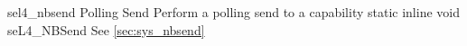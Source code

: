 %
%
%
%

\apidoc
{sel4_nbsend}
{Polling Send}
{Perform a polling send to a capability}
{static inline void seL4\_NBSend}
{
}
{\noret}
{See \autoref{sec:sys_nbsend}}

